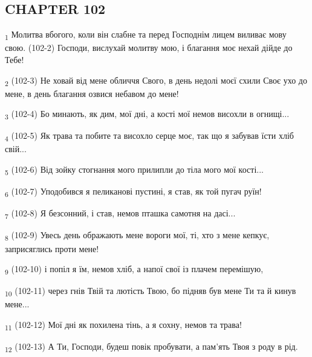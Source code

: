 \subsection{CHAPTER 102}
\begin{tcolorbox}
\textsubscript{1} Молитва вбогого, коли він слабне та перед Господнім лицем виливає мову свою. (102-2) Господи, вислухай молитву мою, і благання моє нехай дійде до Тебе!
\end{tcolorbox}
\begin{tcolorbox}
\textsubscript{2} (102-3) Не ховай від мене обличчя Свого, в день недолі моєї схили Своє ухо до мене, в день благання озвися небавом до мене!
\end{tcolorbox}
\begin{tcolorbox}
\textsubscript{3} (102-4) Бо минають, як дим, мої дні, а кості мої немов висохли в огнищі...
\end{tcolorbox}
\begin{tcolorbox}
\textsubscript{4} (102-5) Як трава та побите та висохло серце моє, так що я забував їсти хліб свій...
\end{tcolorbox}
\begin{tcolorbox}
\textsubscript{5} (102-6) Від зойку стогнання мого прилипли до тіла мого мої кості...
\end{tcolorbox}
\begin{tcolorbox}
\textsubscript{6} (102-7) Уподобився я пеликанові пустині, я став, як той пугач руїн!
\end{tcolorbox}
\begin{tcolorbox}
\textsubscript{7} (102-8) Я безсонний, і став, немов пташка самотня на дасі...
\end{tcolorbox}
\begin{tcolorbox}
\textsubscript{8} (102-9) Увесь день ображають мене вороги мої, ті, хто з мене кепкує, заприсяглись проти мене!
\end{tcolorbox}
\begin{tcolorbox}
\textsubscript{9} (102-10) і попіл я їм, немов хліб, а напої свої із плачем перемішую,
\end{tcolorbox}
\begin{tcolorbox}
\textsubscript{10} (102-11) через гнів Твій та лютість Твою, бо підняв був мене Ти та й кинув мене...
\end{tcolorbox}
\begin{tcolorbox}
\textsubscript{11} (102-12) Мої дні як похилена тінь, а я сохну, немов та трава!
\end{tcolorbox}
\begin{tcolorbox}
\textsubscript{12} (102-13) А Ти, Господи, будеш повік пробувати, а пам'ять Твоя з роду в рід.
\end{tcolorbox}

